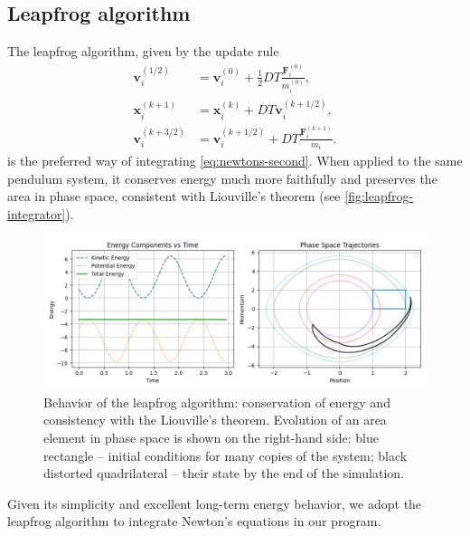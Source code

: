 \subsection{Leapfrog algorithm}
The leapfrog algorithm, given by the update rule \cite{young_leapfrog_2019}
\begin{equation}\label{eq:leapfrog}
    \begin{aligned}
        \mathbf{v}_{i}^{(1/2)} & = \mathbf{v}_i^{(0)} + \frac{1}{2}DT \frac{\mathbf{F}_i^{(0)}}{ m_i^{(0)}}, \\
        \mathbf{x}_i^{(k+1)}   & = \mathbf{x}_i^{(k)} + DT \mathbf{v}_i^{(k+1/2)},                           \\
        \mathbf{v}_i^{(k+3/2)} & = \mathbf{v}_i^{(k+1/2)} + DT \frac{ \mathbf{F}_i^{(k+1)}}{m_i}.
    \end{aligned}
\end{equation}
is the preferred way of integrating \autoref{eq:newtons-second}.
When applied to the same pendulum system, it conserves energy much more faithfully and preserves the area in phase space, consistent with Liouville's theorem (see \autoref{fig:leapfrog-integrator}).
\begin{figure}[htp]
    \centering
    \includegraphics[scale=0.6]{img/integrators/leapfrog-pendulum.png}
    \caption{Behavior of the leapfrog algorithm: conservation of energy and consistency with the Liouville's theorem.
        Evolution of an area element in phase space is shown on the right-hand side: blue rectangle -- initial conditions for many copies of the system; black distorted quadrilateral -- their state by the end of the simulation.}
    \label{fig:leapfrog-integrator}
\end{figure}
Given its simplicity and excellent long-term energy behavior, we adopt the leapfrog algorithm to integrate Newton's equations in our program.